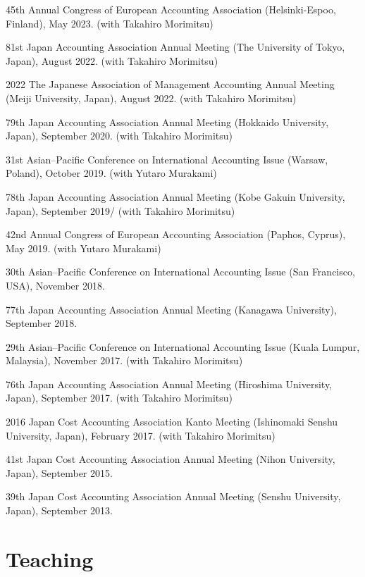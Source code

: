 \documentclass[letterpaper,uplatex]{article}
\renewenvironment{itemize}{
  \begin{list}{}{
    \setlength{\leftmargin}{1.5em}
  }
}{
  \end{list}
}
\begin{document}
\begin{itemize}
    \item 45th Annual Congress of European Accounting Association (Helsinki-Espoo, Finland), May 2023. (with Takahiro Morimitsu)
    \item 81st Japan Accounting Association Annual Meeting (The University of Tokyo, Japan), August 2022. (with Takahiro Morimitsu)
    \item 2022 The Japanese Association of Management Accounting Annual Meeting (Meiji University, Japan), August 2022. (with Takahiro Morimitsu)
  \item 79th Japan Accounting Association Annual Meeting (Hokkaido University, Japan), September 2020. (with Takahiro Morimitsu)
  \item 31st Asian--Pacific Conference on International Accounting Issue (Warsaw, Poland), October 2019. (with Yutaro Murakami)
  \item 78th Japan Accounting Association Annual Meeting (Kobe Gakuin University, Japan), September 2019/ (with Takahiro Morimitsu)
  \item 42nd Annual Congress of European Accounting Association (Paphos, Cyprus), May 2019. (with Yutaro Murakami)
  \item 30th Asian--Pacific Conference on International Accounting Issue (San Francisco, USA), November 2018.
  \item 77th Japan Accounting Association Annual Meeting (Kanagawa University), September 2018.
  \item 29th Asian--Pacific Conference on International Accounting Issue (Kuala Lumpur, Malaysia), November 2017. (with Takahiro Morimitsu)
  \item 76th Japan Accounting Association Annual Meeting (Hiroshima University, Japan), September 2017. (with Takahiro Morimitsu)
  \item 2016 Japan Cost Accounting Association Kanto Meeting (Ishinomaki Senshu University, Japan), February 2017. (with Takahiro Morimitsu)
  \item 41st Japan Cost Accounting Association Annual Meeting (Nihon University, Japan), September 2015.
  \item 39th Japan Cost Accounting Association Annual Meeting (Senshu University, Japan), September 2013.
\end{itemize}

\section*{Teaching}
\end{document}
